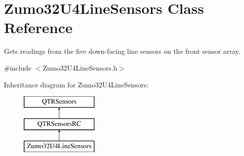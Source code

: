 \hypertarget{class_zumo32_u4_line_sensors}{}\section{Zumo32\+U4\+Line\+Sensors Class Reference}
\label{class_zumo32_u4_line_sensors}


Gets readings from the five down-\/facing line sensors on the front sensor array.  




{\ttfamily \#include $<$Zumo32\+U4\+Line\+Sensors.\+h$>$}

Inheritance diagram for Zumo32\+U4\+Line\+Sensors\+:\begin{figure}[H]
\begin{center}
\leavevmode
\includegraphics[height=3.000000cm]{class_zumo32_u4_line_sensors}
\end{center}
\end{figure}
